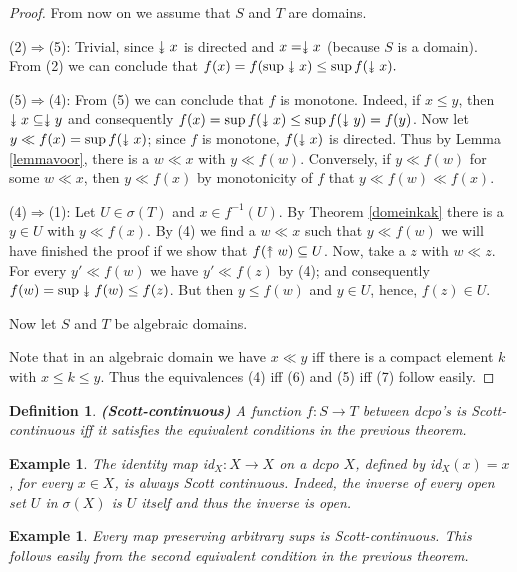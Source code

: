 \documentclass[a4paper,12pt]{article}
\newcommand{\upuparrow}{\mathrel{\reflectbox{\rotatebox[origin=c]{90}{$\twoheadrightarrow$}}}}
\newcommand{\downdownarrow}{\mathrel{\reflectbox{\rotatebox[origin=c]{90}{$\twoheadleftarrow$}}}}
\newtheorem{example}[theorem]{Example}
\newtheorem{definition}[theorem]{Definition}
\begin{document}
\begin{proof}
From now on we assume that $S$ and $T$ are domains.

(2)$\Rightarrow$(5): Trivial, since $\downdownarrow x$ is directed and $x = \downdownarrow x$ (because $S$ is a domain). From (2) we can conclude that $f(x) = f(\sup \downdownarrow x) \leq \sup f(\downdownarrow x).$

(5)$\Rightarrow$(4): From (5) we can conclude that $f$ is monotone. Indeed, if $x \leq y$, then $\downdownarrow x \subseteq \downdownarrow y$ and consequently $f(x) = \sup f(\downdownarrow x) \leq \sup f(\downdownarrow y) = f(y)$. Now let $y \ll f(x) = \sup f(\downdownarrow x)$; since $f$ is monotone, $f(\downdownarrow x)$ is directed. Thus by Lemma \ref{lemmavoor}, there is a $w \ll x$ with $y \ll f(w)$. Conversely, if $y \ll f(w)$ for some $w \ll x$, then $y \ll f(x)$ by monotonicity of $f$ that $y \ll f(w) \ll f(x)$.

(4)$\Rightarrow$(1): Let $U \in \sigma(T)$ and $x \in f^{-1}(U)$. By Theorem \ref{domeinkak} there is a $y \in U$ with $y \ll f(x)$. By (4) we find a $w \ll x$ such that $y \ll f(w)$ we will have finished the proof if we show that $f(\upuparrow w) \subseteq U$. Now, take a $z$ with $w \ll z$. For every $y' \ll f(w)$ we have $y' \ll f(z)$ by (4); and consequently $f(w) = \sup \downdownarrow f(w) \leq f(z)$. But then $y \leq f(w)$ and $y \in U$, hence, $f(z) \in U$.

Now let $S$ and $T$ be algebraic domains.

Note that in an algebraic domain we have $x \ll y$ iff there is a compact element $k$ with $x \leq k \leq y$. Thus the equivalences (4) iff (6) and (5) iff (7) follow easily.
\end{proof}
\begin{definition}\textbf{(Scott-continuous)}
A function $f: S \rightarrow T$ between dcpo's is \emph{Scott-continuous} iff it satisfies the equivalent conditions in the previous theorem.
\end{definition}
\begin{example}
The identity map id$_X: X \rightarrow X$ on a dcpo $X$, defined by id$_X(x) = x$, for every $x \in X$, is always Scott continuous. Indeed, the inverse of every open set $U$ in $\sigma(X)$ is $U$ itself and thus the inverse is open.
\end{example}


\begin{example}
Every map preserving arbitrary sups is Scott-continuous. This follows easily from the second equivalent condition in the previous theorem.
\end{example}
\end{document}
